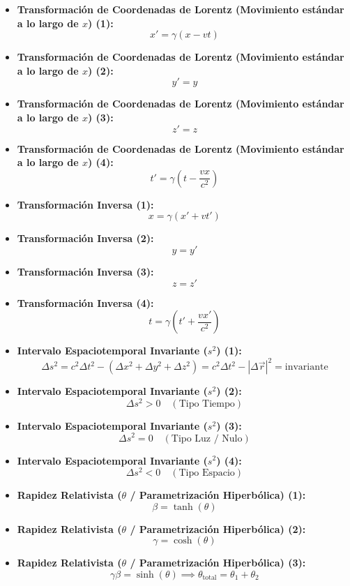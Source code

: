 \documentclass[11pt,a4paper]{article}
\begin{document}
\begin{itemize}
  \item \textbf{Transformación de Coordenadas de Lorentz (Movimiento estándar a lo largo de $x$) (1):}
  \[
    x' = \gamma (x - v t)
  \]
  \item \textbf{Transformación de Coordenadas de Lorentz (Movimiento estándar a lo largo de $x$) (2):}
  \[
    y' = y
  \]
  \item \textbf{Transformación de Coordenadas de Lorentz (Movimiento estándar a lo largo de $x$) (3):}
  \[
    z' = z
  \]
  \item \textbf{Transformación de Coordenadas de Lorentz (Movimiento estándar a lo largo de $x$) (4):}
  \[
    t' = \gamma \left( t - \frac{v x}{c^2} \right)
  \]
  \item \textbf{Transformación Inversa (1):}
  \[
    x = \gamma (x' + v t')
  \]
  \item \textbf{Transformación Inversa (2):}
  \[
    y = y'
  \]
  \item \textbf{Transformación Inversa (3):}
  \[
    z = z'
  \]
  \item \textbf{Transformación Inversa (4):}
  \[
    t = \gamma \left( t' + \frac{v x'}{c^2} \right)
  \]
  \item \textbf{Intervalo Espaciotemporal Invariante ($s^2$) (1):}
  \[
    \Delta s^2 = c^2 \Delta t^2 - (\Delta x^2 + \Delta y^2 + \Delta z^2) = c^2 \Delta t^2 - |\Delta\vec{r}|^2 = \text{invariante}
  \]
  \item \textbf{Intervalo Espaciotemporal Invariante ($s^2$) (2):}
  \[
    \Delta s^2 > 0 \quad (\text{Tipo Tiempo})
  \]
  \item \textbf{Intervalo Espaciotemporal Invariante ($s^2$) (3):}
  \[
    \Delta s^2 = 0 \quad (\text{Tipo Luz / Nulo})
  \]
  \item \textbf{Intervalo Espaciotemporal Invariante ($s^2$) (4):}
  \[
    \Delta s^2 < 0 \quad (\text{Tipo Espacio})
  \]
  \item \textbf{Rapidez Relativista ($\theta$ / Parametrización Hiperbólica) (1):}
  \[
    \beta = \tanh(\theta)
  \]
  \item \textbf{Rapidez Relativista ($\theta$ / Parametrización Hiperbólica) (2):}
  \[
    \gamma = \cosh(\theta)
  \]
  \item \textbf{Rapidez Relativista ($\theta$ / Parametrización Hiperbólica) (3):}
  \[
    \gamma\beta = \sinh(\theta) \implies \theta_{\text{total}} = \theta_1 + \theta_2
  \]
\end{itemize}
\end{document}
